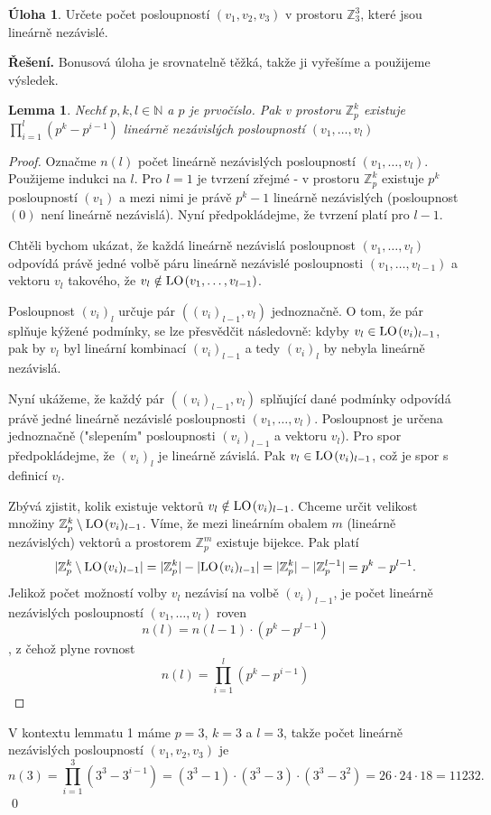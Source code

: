 \documentclass{article}
\theoremstyle{definition}
\newtheorem{uloha}{Úloha}
\theoremstyle{plain}
\newtheorem{lemma}{Lemma}
\newcommand{\N}{\mathbb{N}}
\newcommand{\Z}{\mathbb{Z}}
\newcommand{\LO}{\text{LO\hspace{0.1em}}}
\newenvironment{reseni}{\noindent\textbf{Řešení.}\hspace{0.5em}}{\hfill\qed\medskip}
\begin{document}
\begin{uloha}
Určete počet posloupností $(v_1, v_2, v_3)$ v prostoru $\mathbb{Z}_3^3$, které jsou lineárně nezávislé.
\end{uloha}
\begin{reseni}
Bonusová úloha je srovnatelně těžká, takže ji vyřešíme a použijeme výsledek.
\begin{lemma}
Nechť $p, k, l \in \N$ a $p$ je prvočíslo. Pak v prostoru $\mathbb{Z}_p^k$ existuje $\prod_{i=1}^{l} (p^k-p^{i-1})$ lineárně nezávislých posloupností $(v_1, \hdots, v_l)$
\end{lemma}
\begin{proof}
Označme $n(l)$ počet lineárně nezávislých posloupností $(v_1, \hdots, v_l)$.
Použijeme indukci na $l$. Pro $l = 1$ je tvrzení zřejmé - v prostoru $\mathbb{Z}_p^k$ existuje $p^k$ posloupností $(v_1)$ a mezi nimi je právě $p^k-1$ lineárně nezávislých (posloupnost $(0)$ není lineárně nezávislá).
Nyní předpokládejme, že tvrzení platí pro $l-1$. 


Chtěli bychom ukázat, že každá lineárně nezávislá posloupnost $(v_1, \hdots, v_l)$ odpovídá právě jedné volbě
páru lineárně nezávislé posloupnosti $(v_1, \hdots, v_{l-1})$ a vektoru $v_l$ takového, že $v_l \notin \LO (v_1, \hdots, v_{l-1})$.

Posloupnost $(v_i)_l$ určuje pár $((v_i)_{l-1}, v_l)$ jednoznačně. O tom, že pár splňuje kýžené podmínky, se lze přesvědčit následovně: kdyby $v_l \in \LO (v_i)_{l-1}$, pak by $v_l$ byl lineární kombinací
$(v_i)_{l-1}$ a tedy $(v_i)_l$ by nebyla lineárně nezávislá. 

Nyní ukážeme, že každý pár $((v_i)_{l-1}, v_l)$ splňující dané podmínky odpovídá právě jedné lineárně nezávislé posloupnosti $(v_1, \hdots, v_l)$.
Posloupnost je určena jednoznačně ("slepením" posloupnosti $(v_i)_{l-1}$ a vektoru $v_l$). Pro spor předpokládejme, že $(v_i)_l$ je lineárně závislá. Pak $v_l \in \LO (v_i)_{l-1}$, což je spor s definicí $v_l$.

Zbývá zjistit, kolik existuje vektorů $v_l \notin \LO (v_i)_{l-1}$. Chceme určit velikost množiny $\Z_p^k \setminus \LO (v_i)_{l-1}$. 
Víme, že mezi lineárním obalem $m$ (lineárně nezávislých) vektorů a prostorem $\Z_p^m$ existuje bijekce. Pak platí 
$$ |\Z_p^k \setminus \LO (v_i)_{l-1}| = |\Z_p^k| - |\LO (v_i)_{l-1}| = |\Z_p^k| - |\Z_p^{l-1}| = p^k - p^{l-1}. $$
Jelikož počet možností volby $v_l$ nezávisí na volbě $(v_i)_{l-1}$, je počet lineárně nezávislých posloupností $(v_1, \hdots, v_l)$ roven
$$ n(l) = n(l-1) \cdot (p^k - p^{l-1}) $$
, z čehož plyne rovnost
$$ n(l) = \prod_{i=1}^{l} (p^k - p^{i-1}) $$
\end{proof}
V kontextu lemmatu 1 máme $p = 3$, $k = 3$ a $l = 3$, takže počet lineárně nezávislých posloupností $(v_1, v_2, v_3)$ je
$$ n(3) = \prod_{i=1}^{3} (3^3 - 3^{i-1}) = (3^3 - 1) \cdot (3^3 - 3) \cdot (3^3 - 3^2)= 26 \cdot 24 \cdot 18 = 11232.$$
\end{reseni}
\end{document}
